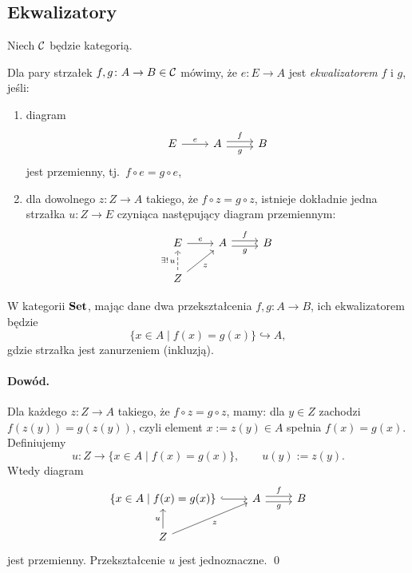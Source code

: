 \subsection*{Ekwalizatory}

Niech $\mathcal{C}$ będzie kategorią.

\begin{definicja}
Dla pary strzałek $f, g \colon A \to B \in \mathcal{C}$ mówimy, że $e\colon E\to A$ jest \emph{ekwalizatorem} $f$ i $g$, jeśli:
\begin{enumerate}
\item diagram
\[\begin{tikzcd}
E \arrow[r,"e"] & A \arrow[r,shift left,"f"] \arrow[r,shift right,swap,"g"] & B
\end{tikzcd}\]
jest przemienny, tj.\ $f\circ e = g\circ e$,
\item dla dowolnego $z\colon Z\to A$ takiego, że $f\circ z = g\circ z$, istnieje dokładnie jedna strzałka $u\colon Z\to E$ czyniąca następujący diagram przemiennym:
\[\begin{tikzcd}
E \arrow[r,"e"] & A \arrow[r,shift left,"f"] \arrow[r,shift right,swap,"g"] & B \\
Z \arrow[ur,swap,"z"] \arrow[u,dashed,"\exists !\, u"] & &
\end{tikzcd}\]
\end{enumerate}
\end{definicja}

\begin{przyklad}
W kategorii $\mathbf{Set}$, mając dane dwa przekształcenia $f,g\colon A\to B$, ich ekwalizatorem będzie
\[
\{x\in A \mid f(x)=g(x)\} \hookrightarrow A,
\]
gdzie strzałka jest zanurzeniem (inkluzją).
\end{przyklad}

\paragraph{Dowód.}
Dla każdego $z\colon Z\to A$ takiego, że $f\circ z = g\circ z$, mamy: dla $y\in Z$ zachodzi $f(z(y)) = g(z(y))$, czyli element $x:=z(y)\in A$ spełnia $f(x)=g(x)$. Definiujemy
\[
u\colon Z \to \{x\in A\mid f(x)=g(x)\}, \qquad u(y) := z(y).
\]
Wtedy diagram
\[\begin{tikzcd}
\{x\in A \mid f(x)=g(x)\} \arrow[r,hook] & A \arrow[r,shift left,"f"] \arrow[r,shift right,swap,"g"] & B \\
Z \arrow[ur,swap,"z"] \arrow[u,"u"] & &
\end{tikzcd}\]
jest przemienny. Przekształcenie $u$ jest jednoznaczne. \qed

